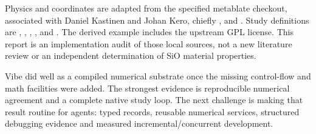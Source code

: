 \documentclass[10pt]{article}
\begin{document}

Physics and coordinates are adapted from the specified metablate checkout,
associated with Daniel Kastinen and Johan Kero, chiefly
,  and
. Study definitions are
, ,
, ,
 and .
The derived example includes the upstream GPL license. This report is an
implementation audit of those local sources, not a new literature review or
an independent determination of SiO material properties.

\begin{mmconclusion}
Vibe did well as a compiled numerical substrate once the missing control-flow
and math facilities were added. The strongest evidence is reproducible numerical
agreement and a complete native study loop. The next challenge is making that
result routine for agents: typed records, reusable numerical services, structured
debugging evidence and measured incremental/concurrent development.
\end{mmconclusion}
\end{document}
